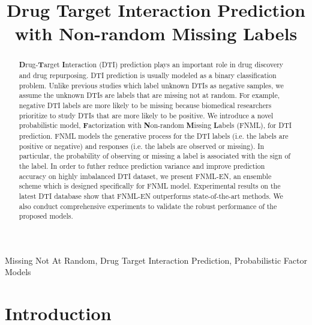 \documentclass[conference]{IEEEtran}
\begin{document}
\title{Drug Target Interaction Prediction with Non-random Missing Labels}

\maketitle

\begin{abstract}\textbf{D}rug-\textbf{T}arget \textbf{I}nteraction (DTI) prediction plays an important role in drug discovery and drug repurposing. DTI prediction is usually modeled as a binary classification problem. Unlike previous studies which label unknown DTIs as negative samples, we assume the unknown DTIs are labels that are missing not at random. For example, negative DTI labels are more likely to be missing because biomedical researchers prioritize to study DTIs that are more likely to be positive. We introduce a novel probabilistic model, \textbf{F}actorization with \textbf{N}on-random \textbf{M}issing \textbf{L}abels (FNML), for DTI prediction.  FNML models the generative process for the DTI labels (i.e. the labels are positive or negative) and responses (i.e. the labels are observed or missing). In particular, the probability of observing or missing a label is associated with the sign of the label. In order to futher reduce prediction variance and improve prediction accuracy on highly imbalanced DTI dataset, we present FNML-EN, an ensemble scheme which is designed specifically for FNML model. Experimental results on the latest DTI database show that FNML-EN outperforms state-of-the-art methods. We also conduct comprehensive experiments to validate the robust performance of the proposed models.
\end{abstract}

\begin{IEEEkeywords}
Missing Not At Random, Drug Target Interaction Prediction, Probabilistic Factor Models
\end{IEEEkeywords}

\section{Introduction}
\end{document}
